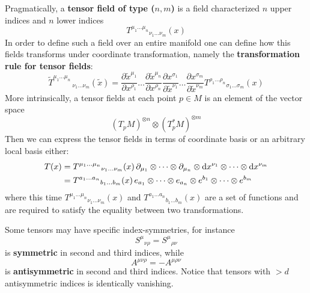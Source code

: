 \documentclass[../main/main.tex]{subfiles}
\begin{document}
\begin{definition}{}

Pragmatically, a \textbf{tensor field of type ($n,m$)} is a field characterized $n$ upper indices and $n$ lower indices
\[{T^{\mu_1\dots\mu_n}}_{\nu_1\dots\nu_m}(x)\]
In order to define such a field over an entire manifold one can define how this fields transforms under coordinate transformation, namely the \textbf{transformation rule for tensor fields}:
\[\boxed{
{\widetilde T^{\mu_1\dots\mu_n}\,}_{\nu_1\dots\nu_m}(\tilde x)=
\frac{\partial \tilde x^{\mu_1}}{\partial x^{\rho_1}}\dots\frac{\partial \tilde x^{\mu_n}}{\partial x^{\rho_n}}\frac{\partial  x^{\sigma_1}}{\partial \tilde x^{\nu_1}}\dots\frac{\partial  x^{\sigma_m}}{\partial \tilde x^{\nu_m}}{T^{\rho_1\dots\rho_n}}_{\sigma_1\dots\sigma_m}(x)
}\]
More intrinsically, a tensor fields at each point $p\in M$ is an element of the vector space
\[(T_pM)^{\otimes n}\otimes(T_p^*M)^{\otimes m}\]
Then we can express the tensor fields in terms of coordinate basis or an arbitrary local basis either:
\begin{align*}
T(x)&={T^{\mu_1\dots\mu_n}}_{\nu_1\dots\nu_m}(x)\,\partial_{\mu_1}\otimes\dots\otimes\partial_{\mu_n}\otimes\textup{d} x^{\nu_1}\otimes\dots\otimes\textup{d} x^{\nu_m}\\
&={T^{a_1\dots a_n}}_{b_1\dots b_m}(x)\,e_{a_1}\otimes\dots\otimes e_{a_n}\otimes e^{b_1}\otimes\dots\otimes e^{b_m}
\end{align*}
where this time ${T^{\mu_1\dots\mu_n}}_{\nu_1\dots\nu_m}(x)$ and ${T^{a_1\dots a_n}}_{b_1\dots b_m}(x)$ are a set of functions and are required to satisfy the equality between two transformations.

Some tensors  may have specific index-symmetries, for instance 
\[{S^\mu}_{\nu\rho}={S^\mu}_{\rho\nu}\]
is \textbf{symmetric} in second and third indices, while
\[A^{\mu\nu\rho}=-A^{\mu\rho\nu}\]
is \textbf{antisymmetric} in second and third indices. Notice that tensors with $>d$ antisymmetric indices is identically vanishing.


\end{definition}
\end{document}
